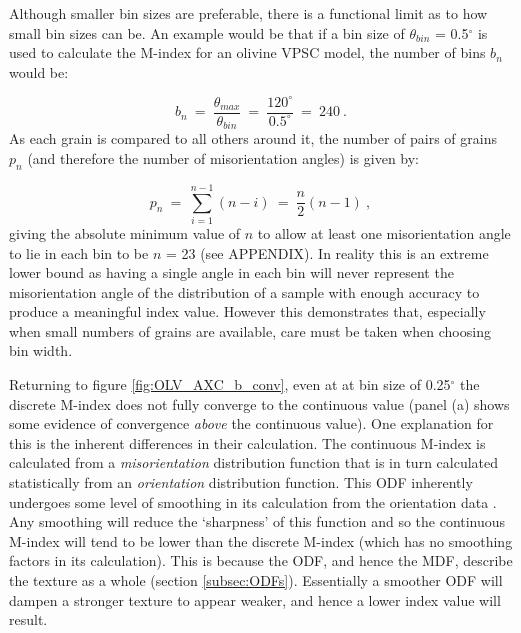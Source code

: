 \documentclass[a4paper,12pt]{report}
\numberwithin{equation}{chapter}
\begin{document}
Although smaller bin sizes are preferable, there is a functional limit as to how small bin sizes can be. An example would be that if a bin size of $\theta_{bin}$ = 0.5$^\circ$ is used to calculate the M-index for an olivine VPSC model, the number of bins $b_n$ would be:

\begin{equation}
b_n\ =\ \frac{\theta_{max}}{\theta_{bin}}\ =\ \frac{120^\circ}{0.5^\circ}\ =\ 240\ . 
\end{equation}     
\noindent
As each grain is compared to all others around it, the number of pairs of grains $p_n$ (and therefore the number of misorientation angles) is given by:

\begin{equation}
p_n\ =\ \sum^{n-1}_{i=1}(n - i)\ =\ \frac{n}{2}(n-1)\ ,
\end{equation} 
\noindent
giving the absolute minimum value of $n$ to allow at least one misorientation angle to lie in each bin to be $n$ = 23 (see APPENDIX). In reality this is an extreme lower bound as having a single angle in each bin will never represent the misorientation angle of the distribution of a sample with enough accuracy to produce a meaningful index value. However this demonstrates that, especially when small numbers of grains are available, care must be taken when choosing bin width. 

Returning to figure \ref{fig:OLV_AXC_b_conv}, even at at bin size of 0.25$^\circ$ the discrete M-index does not fully converge to the continuous value (panel (a) shows some evidence of convergence \emph{above} the continuous value). One explanation for this is the inherent differences in their calculation. The continuous M-index is calculated from a \emph{misorientation} distribution function that is in turn calculated statistically from an \emph{orientation} distribution function. This ODF inherently undergoes some level of smoothing in its calculation from the orientation data \citep[e.g. regularisation when inverting for the ODF in the \texttt{MTEX} algorithm, see][]{Hielscher2008}. Any smoothing will reduce the \lq{}sharpness\rq{} of this function and so the continuous M-index will tend to be lower than the discrete M-index (which has no smoothing factors in its calculation). This is because the ODF, and hence the MDF, describe the texture as a whole (section \ref{subsec:ODFs}). Essentially a smoother ODF will dampen a stronger texture to appear weaker, and hence a lower index value will result. 
\end{document}
